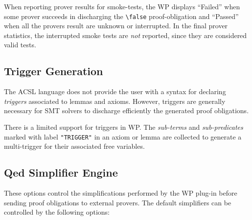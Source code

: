 When reporting prover results for smoke-tests, the \textsf{WP} displays
``Failed'' when some prover succeeds in discharging the \verb+\false+ proof-obligation
and ``Passed'' when all the provers result are unknown or interrupted.
In the final prover statistics, the interrupted smoke tests are \emph{not} reported, since
they are considered valid tests.

\subsection{Trigger Generation}
\label{triggers}

The \textsf{ACSL} language does not provide the user with a syntax for
declaring \emph{triggers} associated to lemmas and axioms. However,
triggers are generally necessary for \textsf{SMT} solvers to discharge
efficiently the generated proof obligations.

There is a limited support for triggers in \textsf{WP}. The
\emph{sub-terms} and \emph{sub-predicates} marked with label
\verb+"TRIGGER"+ in an axiom or lemma are collected to generate a
multi-trigger for their associated free variables.

\subsection{Qed Simplifier Engine}

These options control the simplifications performed by the \textsf{WP} plug-in before
sending proof obligations to external provers. The default simplifiers can be
controlled by the following options:

